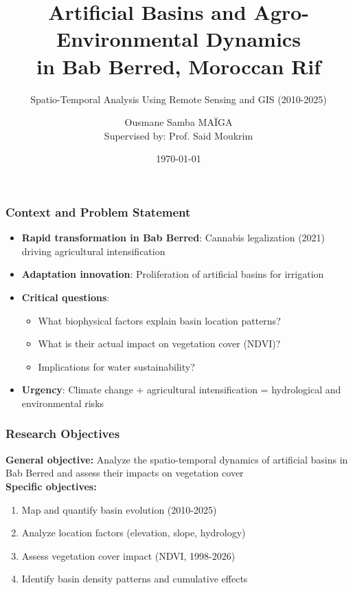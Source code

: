 \documentclass{beamer}
\title{Artificial Basins and Agro-Environmental Dynamics \\ in Bab Berred, Moroccan Rif}
\subtitle{Spatio-Temporal Analysis Using Remote Sensing and GIS (2010-2025)}
\author{Ousmane Samba MAÏGA \\ \small{Supervised by: Prof. Said Moukrim}}
\institute{Rur\_Dynamix Conference 2026 \\ Rural Development and Environmental Dynamics}
\date{\today}
\begin{document}
\frame{\titlepage}

\begin{frame}
\frametitle{Context and Problem Statement}
\begin{itemize}
  \item \textbf{Rapid transformation in Bab Berred}: Cannabis legalization (2021) driving agricultural intensification
  \item \textbf{Adaptation innovation}: Proliferation of artificial basins for irrigation
  \item \textbf{Critical questions}:
  \begin{itemize}
    \item What biophysical factors explain basin location patterns?
    \item What is their actual impact on vegetation cover (NDVI)?
    \item Implications for water sustainability?
  \end{itemize}
  \item \textbf{Urgency}: Climate change + agricultural intensification = hydrological and environmental risks
\end{itemize}
\end{frame}

\begin{frame}
\frametitle{Research Objectives}
\textbf{General objective:} Analyze the spatio-temporal dynamics of artificial basins in Bab Berred and assess their impacts on vegetation cover
\\[0.5cm]
\textbf{Specific objectives:}
\begin{enumerate}
  \item Map and quantify basin evolution (2010-2025)
  \item Analyze location factors (elevation, slope, hydrology)
  \item Assess vegetation cover impact (NDVI, 1998-2026)
  \item Identify basin density patterns and cumulative effects
\end{enumerate}
\end{frame}
\end{document}
